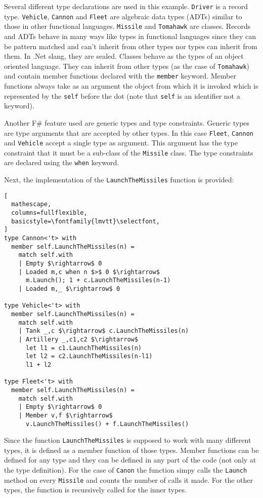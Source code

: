 \documentclass{sigplanconf}
\begin{document}
Several different type declarations are used in this example. \verb+Driver+ is a record type. \verb+Vehicle+, \verb+Cannon+ and \verb+Fleet+ are algebraic data types (ADTs) similar to those in other functional languages. \verb+Missile+ and \verb+Tomahawk+ are classes. Records and ADTs behave in many ways like types in functional languages since they can be pattern matched and can't inherit from other types nor types can inherit from them. In .Net slang, they are sealed. Classes behave as the types of an object oriented language. They can inherit from other types (as the case of \verb+Tomahawk+) and contain member functions declared with the \verb+member+ keyword. Member functions always take as an argument the object from which it is invoked which is represented by the \verb+self+ before the dot (note that \verb+self+ is an identifier not a keyword).

Another F\# feature used are generic types and type constraints. Generic types are type arguments that are accepted by other types. In this case \verb+Fleet+, \verb+Cannon+ and \verb+Vehicle+ accept a single type as argument. This argument has the type constraint that it must be a sub-class of the \verb+Missile+ class. The type constraints are declared using the \verb+when+ keyword.

Next, the implementation of the \verb+LaunchTheMissiles+ function is provided:
\begin{lstlisting}[
  mathescape,
  columns=fullflexible,
  basicstyle=\fontfamily{lmvtt}\selectfont,
]
type Cannon<'t> with
  member self.LaunchTheMissiles(n) = 
    match self.with
    | Empty $\rightarrow$ 0
    | Loaded m,c when n $>$ 0 $\rightarrow$ 
      m.Launch(); 1 + c.LaunchTheMissiles(n-1)
    | Loaded m,_ $\rightarrow$ 0

type Vehicle<'t> with
  member self.LaunchTheMissiles(n) =
    match self.with
    | Tank _,c $\rightarrow$ c.LaunchTheMissiles(n)
    | Artillery _,c1,c2 $\rightarrow$
      let l1 = c1.LaunchTheMissiles(n)
      let l2 = c2.LaunchTheMissiles(n-l1)
      l1 + l2

type Fleet<'t> with
  member self.LaunchTheMissiles(n) =
    match self.with
    | Empty $\rightarrow$ 0
    | Member v,f $\rightarrow$ 
      v.LaunchTheMissiles() + f.LaunchTheMissiles()
\end{lstlisting}
Since the function \verb+LaunchTheMissiles+ is supposed to work with many different types, it is defined as a member function of those types. Member functions can be defined for any type and they can be defined in any part of the code (not only at the type definition). For the case of \verb+Canon+ the function simpy calls the \verb+Launch+ method on every \verb+Missile+ and counts the number of calls it made. For the other types, the function is recursively called for the inner types.
\end{document}
